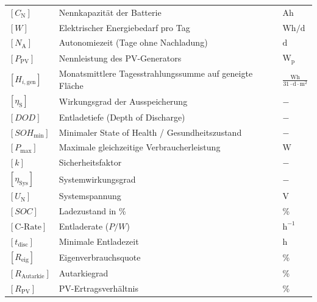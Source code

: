 \renewcommand{\arraystretch}{1.2}
\begin{tabular}{@{} l p{6.5cm} l @{}}
    $[C_{\mathrm{N}}]$           & Nennkapazität der Batterie \dotfill                                  & $\mathrm{Ah}$ \\
    $[W]$                        & Elektrischer Energiebedarf pro Tag \dotfill                          & $\mathrm{Wh/d}$ \\
    $[N_{\mathrm{A}}]$           & Autonomiezeit (Tage ohne Nachladung) \dotfill                        & $\mathrm{d}$ \\
    $[P_{\mathrm{PV}}]$          & Nennleistung des PV-Generators \dotfill                              & $\mathrm{W_p}$ \\
    $[H_{i,\mathrm{gen}}]$       & Monatsmittlere Tagesstrahlungssumme auf geneigte Fläche \dotfill     & $\frac{\mathrm{Wh}}{\mathrm{31 \cdot d \cdot m^2}}$ \\
    $[\eta_{\mathrm{S}}]$        & Wirkungsgrad der Ausspeicherung \dotfill                             & $-$ \\
    $[DOD]$                      & Entladetiefe (Depth of Discharge) \dotfill                           & $-$ \\
    $[SOH_{\mathrm{min}}]$       & Minimaler State of Health / Gesundheitszustand \dotfill              & $-$ \\
    $[P_{\mathrm{max}}]$         & Maximale gleichzeitige Verbraucherleistung \dotfill                  & $\mathrm{W}$ \\
    $[k]$                        & Sicherheitsfaktor \dotfill                                           & $-$ \\
    $[\eta_{\mathrm{Sys}}]$      & Systemwirkungsgrad \dotfill                                          & $-$ \\
    $[U_{\mathrm{N}}]$           & Systemspannung \dotfill                                              & $\mathrm{V}$ \\
    $[SOC]$                      & Ladezustand in \% \dotfill                                           & \% \\
    $[\text{C-Rate}]$            & Entladerate ($P/W$) \dotfill                                         & $\mathrm{h^{-1}}$ \\
    $[t_{\mathrm{disc}}]$        & Minimale Entladezeit \dotfill                                       & $\mathrm{h}$ \\
    $[R_{\mathrm{eig}}]$         & Eigenverbrauchsquote \dotfill                                        & \% \\
    $[R_{\mathrm{Autarkie}}]$    & Autarkiegrad \dotfill                                                & \% \\
    $[R_{\mathrm{PV}}]$          & PV-Ertragsverhältnis \dotfill                                       & \% \\
\end{tabular}


